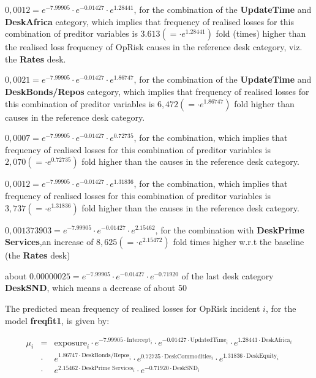 \documentclass{DissertateUSU}
\begin{document}
\begin{list}{*}{}
\item $0,0012 = e^{-7.99905}\cdot e^{-0.01427}\cdot e^{1.28441}$, for the combination of the \textbf{UpdateTime} and \textbf{DeskAfrica} category, which implies that frequency of realised losses for this combination of preditor variables is $3.613 (=\cdot e^{1.28441})$ fold (times) higher than the realised loss frequency of OpRisk causes in the reference desk category, viz. the \textbf{Rates} desk. 
\item $0,0021 = e^{-7.99905}\cdot e^{-0.01427}\cdot e^{1.86747}$, for the combination of the \textbf{UpdateTime} and \textbf{DeskBonds/Repos} category, which implies that frequency of realised losses for this combination of preditor variables is $6,472(=\cdot e^{1.86747})$ fold higher than causes in the reference desk category.
\item $0,0007 = e^{-7.99905}\cdot e^{-0.01427}\cdot e^{0.72735}$, for the combination, which implies that frequency of realised losses for this combination of preditor variables is $2,070(=\cdot e^{0.72735})$ fold higher than the causes in the reference desk category.
\item $0,0012 = e^{-7.99905}\cdot e^{-0.01427}\cdot e^{1.31836}$, for the combination, which implies that frequency of realised losses for this combination of preditor variables is $3,737(=\cdot e^{1.31836})$ fold higher than the causes in the reference desk category.
\item $0,001373903 = e^{-7.99905}\cdot e^{-0.01427}\cdot e^{2.15462}$, for the combination with \textbf{DeskPrime Services},an increase of $8,625(=\cdot e^{2.15472})$ fold times higher w.r.t the baseline (the \textbf{Rates} desk)
\item about $0.00000025 = e^{-7.99905}\cdot e^{-0.01427}\cdot e^{-0.71920}$ of the last desk category \textbf{DeskSND}, which means a decrease of about 50%
\end{list}

The predicted mean frequency of realised losses for OpRisk incident
\(i\), for the model \textbf{freqfit1}, is given by:

\singlespacing

\begin{eqnarray}
\mu_{i}& = &\mbox{exposure}_i\cdot e^{-7.99905\cdot \mbox{Intercept}_i}\cdot e^{-0.01427\cdot \mbox{UpdatedTime}_i}\cdot e^{1.28441\cdot \mbox{DeskAfrica}_i}\nonumber\\
&\cdot&e^{1.86747\cdot \mbox{DeskBonds/Repos}_i}\cdot e^{0.72735\cdot \mbox{DeskCommodities}_i}\cdot e^{1.31836\cdot \mbox{DeskEquity}_i}\nonumber\\
&\cdot& e^{2.15462\cdot \mbox{DeskPrime Services}_i}\cdot e^{-0.71920\cdot \mbox{DeskSND}_i}
\end{eqnarray} \doublespacing
\end{document}
